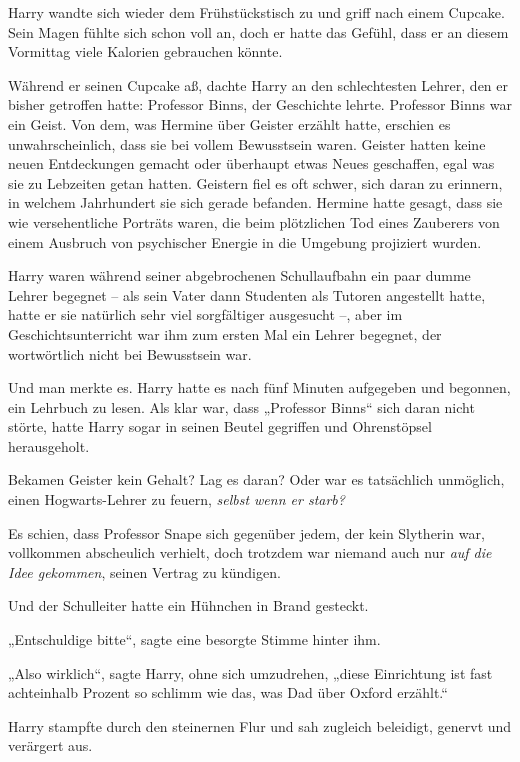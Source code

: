 {Harry wandte sich wieder dem Frühstückstisch zu und griff nach einem Cupcake. Sein Magen fühlte sich schon voll an, doch er hatte das Gefühl, dass er an diesem Vormittag viele Kalorien gebrauchen könnte.

Während er seinen Cupcake aß, dachte Harry an den schlechtesten Lehrer, den er bisher getroffen hatte: Professor Binns, der Geschichte lehrte. Professor Binns war ein Geist. Von dem, was Hermine über Geister erzählt hatte, erschien es unwahrscheinlich, dass sie bei vollem Bewusstsein waren. Geister hatten keine neuen Entdeckungen gemacht oder überhaupt etwas Neues geschaffen, egal was sie zu Lebzeiten getan hatten. Geistern fiel es oft schwer, sich daran zu erinnern, in welchem Jahrhundert sie sich gerade befanden. Hermine hatte gesagt, dass sie wie versehentliche Porträts waren, die beim plötzlichen Tod eines Zauberers von einem Ausbruch von psychischer Energie in die Umgebung projiziert wurden.

Harry waren während seiner abgebrochenen Schullaufbahn ein paar dumme Lehrer begegnet -- als sein Vater dann Studenten als Tutoren angestellt hatte, hatte er sie natürlich sehr viel sorgfältiger ausgesucht --, aber im Geschichtsunterricht war ihm zum ersten Mal ein Lehrer begegnet, der wortwörtlich nicht bei Bewusstsein war.

Und man merkte es. Harry hatte es nach fünf Minuten aufgegeben und begonnen, ein Lehrbuch zu lesen. Als klar war, dass „Professor Binns“ sich daran nicht störte, hatte Harry sogar in seinen Beutel gegriffen und Ohrenstöpsel herausgeholt.

Bekamen Geister kein Gehalt? Lag es daran? Oder war es tatsächlich unmöglich, einen Hogwarts-Lehrer zu feuern, \emph{selbst wenn er starb?}

Es schien, dass Professor Snape sich gegenüber jedem, der kein Slytherin war, vollkommen abscheulich verhielt, doch trotzdem war niemand auch nur \emph{auf die Idee gekommen}, seinen Vertrag zu kündigen.

Und der Schulleiter hatte ein Hühnchen in Brand gesteckt.

„Entschuldige bitte“, sagte eine besorgte Stimme hinter ihm.

„Also wirklich“, sagte Harry, ohne sich umzudrehen, „diese Einrichtung ist fast achteinhalb Prozent so schlimm wie das, was Dad über Oxford erzählt.“

\later

Harry stampfte durch den steinernen Flur und sah zugleich beleidigt, genervt und verärgert aus.

}
